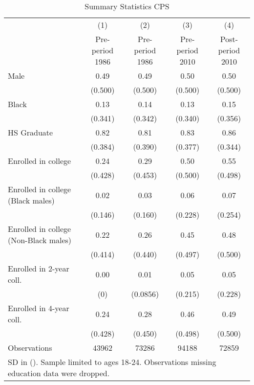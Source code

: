 \begin{table}[htbp]\centering
\caption{Summary Statistics CPS}
\begin{tabular}{l*{4}{c}}
\hline\hline
                    &\multicolumn{1}{c}{(1)}&\multicolumn{1}{c}{(2)}&\multicolumn{1}{c}{(3)}&\multicolumn{1}{c}{(4)}\\
                    &\multicolumn{1}{c}{Pre-period 1986}&\multicolumn{1}{c}{Pre-period 1986}&\multicolumn{1}{c}{Pre-period 2010}&\multicolumn{1}{c}{Post-period 2010}\\
\hline
Male                &        0.49&        0.49&        0.50&        0.50\\
                    &     (0.500)&     (0.500)&     (0.500)&     (0.500)\\
[1em]
Black               &        0.13&        0.14&        0.13&        0.15\\
                    &     (0.341)&     (0.342)&     (0.340)&     (0.356)\\
[1em]
HS Graduate         &        0.82&        0.81&        0.83&        0.86\\
                    &     (0.384)&     (0.390)&     (0.377)&     (0.344)\\
[1em]
Enrolled in college &        0.24&        0.29&        0.50&        0.55\\
                    &     (0.428)&     (0.453)&     (0.500)&     (0.498)\\
[1em]
Enrolled in college (Black males)&        0.02&        0.03&        0.06&        0.07\\
                    &     (0.146)&     (0.160)&     (0.228)&     (0.254)\\
[1em]
Enrolled in college (Non-Black males)&        0.22&        0.26&        0.45&        0.48\\
                    &     (0.414)&     (0.440)&     (0.497)&     (0.500)\\
[1em]
Enrolled in 2-year coll.&        0.00&        0.01&        0.05&        0.05\\
                    &         (0)&    (0.0856)&     (0.215)&     (0.228)\\
[1em]
Enrolled in 4-year coll.&        0.24&        0.28&        0.46&        0.49\\
                    &     (0.428)&     (0.450)&     (0.498)&     (0.500)\\
\hline
Observations        &       43962&       73286&       94188&       72859\\
\hline\hline
\multicolumn{5}{l}{\footnotesize SD in (). Sample limited to ages 18-24. Observations missing education data were dropped.}\\
\end{tabular}
\end{table}
